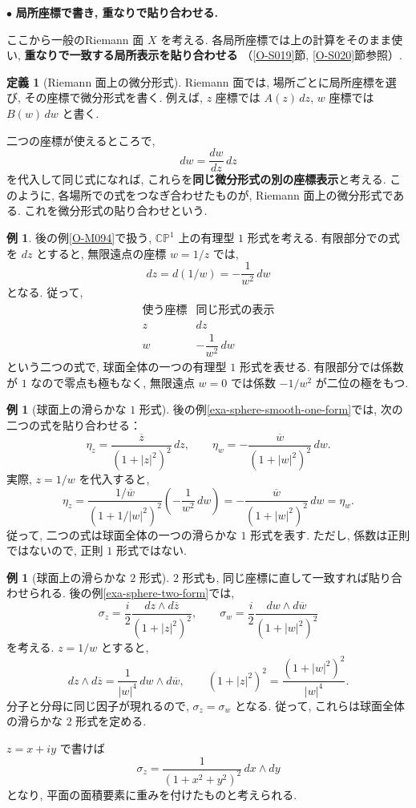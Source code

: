 \documentclass[dvipdfmx,a4paper,11pt]{article} %
\newcommand{\C}{\mathbb{C}}
\theoremstyle{definition}
\numberwithin{equation}{section}
\newtheorem{dfn}[thm]{定義}
\newtheorem{exa}[thm]{例}
\begin{document}
\medskip
\noindent
$\bullet$ \textbf{局所座標で書き, 重なりで貼り合わせる.}

ここから一般のRiemann 面 $X$ を考える.
各局所座標では上の計算をそのまま使い,
\textbf{重なりで一致する局所表示を貼り合わせる}
（\ref{O-S019}節, \ref{O-S020}節参照）.

\begin{dfn}[Riemann 面上の微分形式]
Riemann 面では, 場所ごとに局所座標を選び,
その座標で微分形式を書く.
例えば, $z$ 座標では $A(z)\,dz$,
$w$ 座標では $B(w)\,dw$ と書く.

二つの座標が使えるところで,
\[
dw=\frac{dw}{dz}\,dz
\]
を代入して同じ式になれば,
これらを\textbf{同じ微分形式の別の座標表示}と考える.
このように, 各場所での式をつなぎ合わせたものが,
Riemann 面上の微分形式である.
これを微分形式の貼り合わせという.
\end{dfn}

\begin{exa}
後の例\ref{O-M094}で扱う,
$\C\mathbb P^1$ 上の有理型 $1$ 形式を考える.
有限部分での式を $dz$ とすると,
無限遠点の座標 $w=1/z$ では,
\[
dz=d(1/w)=-\frac1{w^2}\,dw
\]
となる.
従って,
\[
\begin{array}{c|c}
\text{使う座標}&\text{同じ形式の表示}\\ \hline
z&dz\\[2pt]
w&-\dfrac1{w^2}\,dw
\end{array}
\]
という二つの式で, 球面全体の一つの有理型 $1$ 形式を表せる.
有限部分では係数が $1$ なので零点も極もなく,
無限遠点 $w=0$ では係数 $-1/w^2$ が二位の極をもつ.
\end{exa}

\begin{exa}[球面上の滑らかな $1$ 形式]
後の例\ref{exa-sphere-smooth-one-form}では,
次の二つの式を貼り合わせる：
\[
\eta_z=\frac{\overline z}{(1+|z|^2)^2}\,dz,
\qquad
\eta_w=-\frac{\overline w}{(1+|w|^2)^2}\,dw.
\]
実際, $z=1/w$ を代入すると,
\[
\eta_z
=\frac{1/\overline w}{(1+1/|w|^2)^2}
\left(-\frac1{w^2}\,dw\right)
=-\frac{\overline w}{(1+|w|^2)^2}\,dw
=\eta_w.
\]
従って, 二つの式は球面全体の一つの滑らかな $1$ 形式を表す.
ただし, 係数は正則ではないので, 正則 $1$ 形式ではない.
\end{exa}

\begin{exa}[球面上の滑らかな $2$ 形式]
$2$ 形式も, 同じ座標に直して一致すれば貼り合わせられる.
後の例\ref{exa-sphere-two-form}では,
\[
\sigma_z=\frac{i}{2}\frac{dz\wedge d\overline z}{(1+|z|^2)^2},
\qquad
\sigma_w=\frac{i}{2}\frac{dw\wedge d\overline w}{(1+|w|^2)^2}
\]
を考える.
$z=1/w$ とすると,
\[
dz\wedge d\overline z
=\frac1{|w|^4}\,dw\wedge d\overline w,
\qquad
(1+|z|^2)^2=\frac{(1+|w|^2)^2}{|w|^4}.
\]
分子と分母に同じ因子が現れるので,
$\sigma_z=\sigma_w$ となる.
従って, これらは球面全体の滑らかな $2$ 形式を定める.

$z=x+iy$ で書けば
\[
\sigma_z=\frac1{(1+x^2+y^2)^2}\,dx\wedge dy
\]
となり, 平面の面積要素に重みを付けたものと考えられる.
\end{exa}
\end{document}
